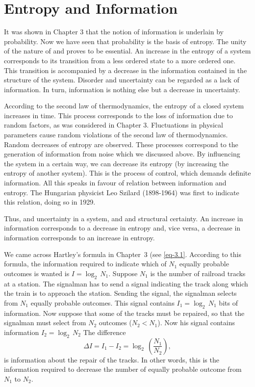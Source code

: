\section{Entropy and Information }

 It was shown in Chapter 3 that the notion of information is underlain by probability. Now we have seen that probability is the basis of entropy. The unity of the nature of  and  proves to be essential. An increase in the entropy of a system corresponds to its transition from a less ordered state to a more ordered one. This transition is accompanied by a decrease in the information contained in the structure of the system. Disorder and uncertainty can be regarded as a lack of information. In turn, information is nothing else but a decrease in uncertainty.


According to the second law of thermodynamics, the entropy of a closed system increases in time. This process corresponds to the loss of information due to random factors, as was considered in Chapter 3. Fluctuations in physical parameters cause random violations of the second law of thermodynamics. Random decreases of entropy are observed. These processes correspond to the generation of information from noise which we discussed above. By influencing the system in a certain way, we can decrease its entropy (by increasing the entropy of another system). This is the process of control, which demands definite information.
All this speaks in favour of relation between information and entropy. The Hungarian physicist Leo Szilard (1898-1964) was first to indicate this relation, doing so in 1929.

Thus,  and uncertainty in a system, and  and structural certainty. An increase in information corresponds to a decrease in entropy and, vice versa, a decrease in information corresponds to an increase in entropy.

 We came across Hartley's formula in Chapter~3 (see \eqref{eq-3.1}. According to this formula, the information required to indicate which of $N_{1}$ equally probable outcomes is wanted is $I= \log_{2} \, N_{1}$. Suppose $N_{1}$ is the number of railroad tracks at a station. The signalman has to send a signal indicating the track along which the train is to approach the station. Sending the signal, the signalman selects from $N_{1}$ equally probable outcomes. This signal contains  $I_{1} = \log_{2} \, N_{1}$ bits of	information. Now suppose	that	some of the tracks must be repaired, so that the signalman must select from $ N_{2}$ outcomes ($ N_{2} <  N_{1}$). Now his signal contains information $I_{2} = \log_{2} \, N_{2}$ The difference
\begin{equation}%
\Delta I = I_{1}- I_{2} = \log_{2} \, \left( \frac{N_{1}}{N_{2}} \right),
\label{eq-4.60}
\end{equation}
is information about the repair of the tracks. In other words, this is the information required to decrease the number of equally probable outcome	from $N_{1}$ to $ N_{2}$.


